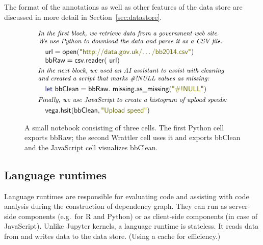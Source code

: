 \documentclass[sigplan,preprint,10pt]{acmart}\settopmatter{printfolios=true,printccs=false,printacmref=false}
\theoremstyle{plain}
\theoremstyle{definition}
\newcommand{\str}[1]{\textnormal{\textcolor{strclr}{\sffamily "#1"}}}
\newcommand{\ident}[1]{\textnormal{\sffamily #1}}
\newcommand{\kvd}[1]{\textnormal{\textcolor{kvdclr}{\sffamily #1}}}
\begin{document}
\noindent
The format of the annotations as well as other features of the data store are discussed in
more detail in Section~\ref{sec:datastore}.

\begin{figure}
\begin{equation*}
\begin{array}{l}
\textit{\small{In the first block, we retrieve data from a government web site.}}\\[-0.1em]
\textit{\small{We use Python to download the data and parse it as a CSV file.}}\\[0.3em]
\quad\ident{url}=\ident{open}(\str{http://data.gov.uk/\ldots/bb2014.csv})\\
\quad\ident{bbRaw}=\ident{csv.reader}(\ident{url})\\[0.2em]
\textit{\small{In the next block, we used an AI assistant to assist with cleaning}}\\[-0.1em]
\textit{\small{and created a script that marks \#!NULL values as missing:}}\\[0.3em]
\quad\kvd{let}~\ident{bbClean} = \ident{bbRaw}.\ident{missing}.\ident{as\_missing}(\str{\#!NULL})\\[0.3em]
\textit{\small{Finally, we use JavaScript to create a histogram of upload speeds:}}\\[0.3em]
\quad\ident{vega}.\ident{hsit}(\ident{bbClean}, \str{Upload speed})
\end{array}
\end{equation*}
\vspace{-0.5em}
\caption{\small{A small notebook consisting of three cells. The first Python cell exports
\ident{bbRaw}; the second Wrattler cell uses it and exports \ident{bbClean} and the
JavaScript cell visualizes \ident{bbClean}.}}
\label{fig:notebook}
\end{figure}

\subsection{Language runtimes}

Language runtimes are responsible for evaluating code and assisting with code analysis during
the construction of dependency graph. They can run as server-side components (e.g.~for R and Python)
or as client-side components (in case of JavaScript).
Unlike Jupyter kernels, a language runtime is stateless. It reads data from and writes data to
the data store. (Using a cache for efficiency.)
\end{document}

